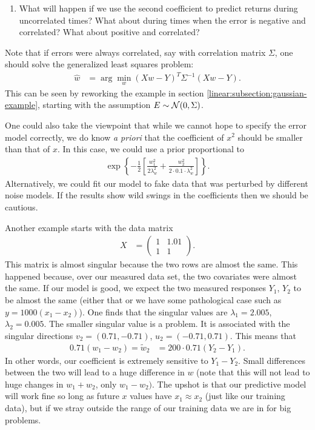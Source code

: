 \begin{exercise}
\begin{enumerate}
\item What will happen if we use the second coefficient to predict returns during uncorrelated times?  What about during times when the error is negative and correlated?   What about positive and correlated?
  \end{enumerate}
  Note that if errors were always correlated, say with correlation matrix $\Sigma$, one should solve the generalized least squares problem:
  \begin{align*}
    \hat w &= \arg\min_w (Xw - Y)^T\Sigma^{-1}(Xw-Y).
  \end{align*}
  This can be seen by reworking the example in section \ref{linear:subsection:gaussian-example}, starting with the assumption $E\sim{\mathcal N}(0, \Sigma)$.

  One could also take the viewpoint that while we cannot hope to specify the error model correctly, we do know \emph{a priori} that the coefficient of $x^2$ should be smaller than that of $x$.  In this case, we could use a prior proportional to 
  \begin{align*}
    \exp\left\{ -\frac{1}{2}\left[ \frac{w_1^2}{2\lambda_w^2} + \frac{w_2^2}{2\cdot0.1\cdot\lambda_w^2} \right] \right\}.
  \end{align*}
  Alternatively, we could fit our model to fake data that was perturbed by different noise models.  If the results show wild swings in the coefficients then we should be cautious.
\end{exercise}

\begin{example}
  \label{linear:example:small-singular-values}
Another example starts with the data matrix
\begin{align*}
  X &= 
  \left( 
  \begin{matrix}
    1 & 1.01\\
    1 & 1
  \end{matrix}
  \right).
\end{align*}
This matrix is almost singular because the two rows are almost the same.  This happened because, over our measured data set, the two covariates were almost the same.  If our model is good, we expect the two measured responses $Y_1$, $Y_2$ to be almost the same (either that or we have some pathological case such as $y = 1000(x_1 - x_2)$).  One finds that the singular values are $\lambda_1=2.005$, $\lambda_2=0.005$.  The smaller singular value is a problem.  It is associated with the singular directions $v_2=(0.71, -0.71)$, $u_2=(-0.71, 0.71)$.  This means that 
\begin{align*}
  0.71(w_1 -w_2) = \tilde w_2 &= 200\cdot0.71(Y_2 - Y_1).
\end{align*}
In other words, our coefficient is extremely sensitive to $Y_1-Y_2$.  Small differences between the two will lead to a huge difference in $w$ (note that this will not lead to huge changes in $w_1+w_2$, only $w_1-w_2)$.  The upshot is that our predictive model will work fine so long as future $x$ values have $x_1\approx x_2$ (just like our training data), but if we stray outside the range of our training data we are in for big problems.
\end{example}

